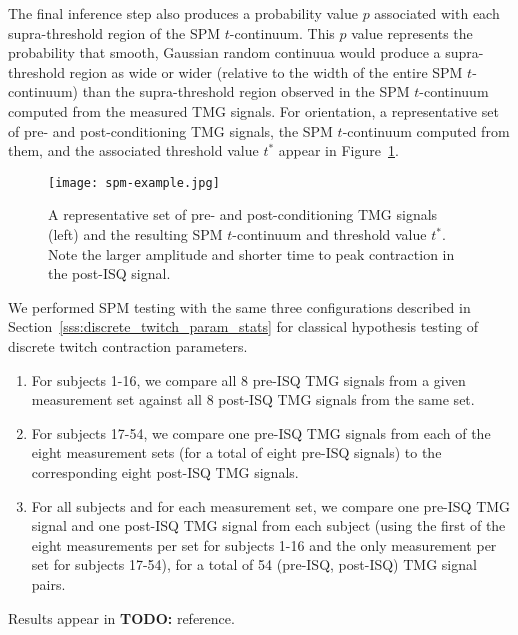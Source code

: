 \documentclass[utf8]{style/FrontiersinHarvard}
\newcommand{\TODO}[1]{{\textbf{TODO:} {\color{red} #1}}}
\begin{document}
The final inference step also produces a probability value $ p $ associated with each supra-threshold region of the SPM $ t $-continuum.
This $ p $ value represents the probability that smooth, Gaussian random continuua would produce a supra-threshold region as wide or wider (relative to the width of the entire SPM $ t $-continuum) than the supra-threshold region observed in the SPM $ t $-continuum computed from the measured TMG signals.
For orientation, a representative set of pre- and post-conditioning TMG signals, the SPM $ t $-continuum computed from them, and the associated threshold value $ t^{*} $ appear in Figure~\ref{fig:spm_example}.

\begin{figure}
	\centering
    \texttt{[image: spm-example.jpg]}
    \caption{A representative set of pre- and post-conditioning TMG signals (left) and the resulting SPM $ t $-continuum and threshold value $ t^{*} $.
    Note the larger amplitude and shorter time to peak contraction in the post-ISQ signal.}
    \label{fig:spm_example}
\end{figure}

We performed SPM testing with the same three configurations described in Section~\ref{sss:discrete_twitch_param_stats} for classical hypothesis testing of discrete twitch contraction parameters.
\begin{enumerate}

    \item For subjects 1-16, we compare all 8 pre-ISQ TMG signals from a given measurement set against all 8 post-ISQ TMG signals from the same set.

    \item For subjects 17-54, we compare one pre-ISQ TMG signals from each of the eight measurement sets (for a total of eight pre-ISQ signals) to the corresponding eight post-ISQ TMG signals.

    \item For all subjects and for each measurement set, we compare one pre-ISQ TMG signal and one post-ISQ TMG signal from each subject (using the first of the eight measurements per set for subjects 1-16 and the only measurement per set for subjects 17-54), for a total of 54 (pre-ISQ, post-ISQ) TMG signal pairs.

\end{enumerate}
Results appear in \TODO{reference}.
\end{document}
